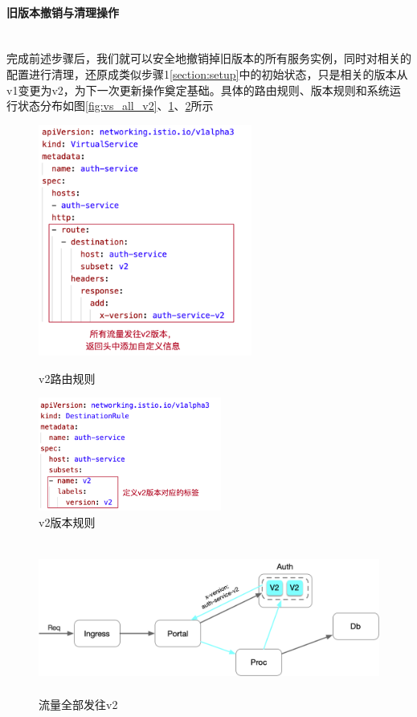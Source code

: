 \documentclass[a4paper, 12pt]{article}
\theoremstyle{definition}
\begin{document}
\paragraph{旧版本撤销与清理操作}\mbox{}\\

完成前述步骤后，我们就可以安全地撤销掉旧版本的所有服务实例，同时对相关的配置进行清理，还原成类似步骤1\ref{section:setup}中的初始状态，只是相关的版本从v1变更为v2，为下一次更新操作奠定基础。具体的路由规则、版本规则和系统运行状态分布如图\ref{fig:vs_all_v2}、\ref{fig:dr_v2}、\ref{fig:traffic_all_v2}所示
\begin{figure}[!ht]
\centering
\begin{minipage}[t]{0.48\textwidth}
\centering
\centerline{\includegraphics[width=7cm]{vs_all_v2.png}}
\caption{v2路由规则}
\label{fig:vs_all_v2}
\end{minipage}
\begin{minipage}[t]{0.48\textwidth}
\centering
\centerline{\includegraphics[width=6cm]{dr_v2.png}}
\caption{v2版本规则}
\label{fig:dr_v2}
\end{minipage}
\end{figure}
\begin{figure}[!ht]
 \centering
 \includegraphics[height=5cm]{images/traffic_all_v2.png}
 \caption{流量全部发往v2}
 \label{fig:traffic_all_v2}
\end{figure}
\end{document}
